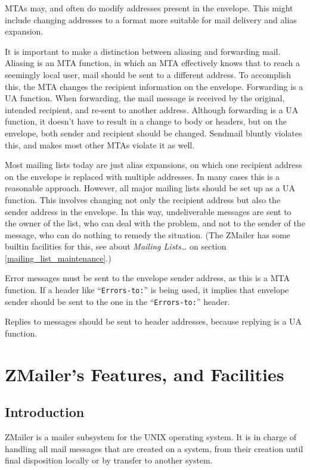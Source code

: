 MTAs may, and often do modify addresses present in the envelope. This might 
include changing addresses to a format more suitable for mail delivery and 
alias expansion.

It is important to make a distinction between aliasing and forwarding mail. 
Aliasing is an MTA function, in which an MTA effectively knows that to reach 
a seemingly local user, mail should be sent to a different address. 
To accomplish this, the MTA changes the recipient information on the envelope. 
Forwarding is a UA function. When forwarding, the mail message is received 
by the original, intended recipient, and re-sent to another address. Although 
forwarding is a UA function, it doesn't have to result in a change to body or 
headers, but on the envelope, both sender and recipient should be changed. 
Sendmail bluntly violates this, and makes most other MTAs violate it as well.

Most mailing lists today are just alias expansions, on which one recipient 
address on the envelope is replaced with multiple addresses. In many cases 
this is a reasonable approach. However, all major mailing lists should be 
set up as a UA function. This involves changing not only the recipient 
address but also the sender address in the envelope. In this way, 
undeliverable messages are sent to the owner of the list, who can deal 
with the problem, and not to the sender of the message, who can do nothing 
to remedy the situation.
(The ZMailer has some builtin facilities for this, see about
 {\em Mailing Lists\ldots} on section \vref{mailing_list_maintenance}.)

Error messages must be sent to the envelope sender address, as this is a 
MTA function. If a header like ``{\tt Errors-to:}'' is being used, it implies 
that envelope sender should be sent to the one in the ``{\tt Errors-to:}''
header.

Replies to messages should be sent to header addresses, because replying is 
a UA function.


\section{ZMailer's Features, and Facilities}


\subsection{Introduction}

ZMailer is a mailer subsystem for the UNIX operating system.
It is in charge of handling all mail messages that are created
on a system, from their creation until final disposition locally
or by transfer to another system.

